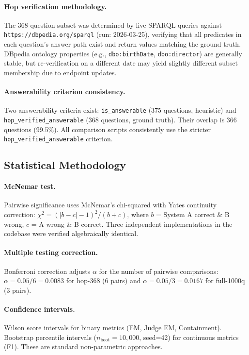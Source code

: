 \paragraph{Hop verification methodology.}
The 368-question subset was determined by live SPARQL queries against \texttt{https://dbpedia.org/sparql} (run: 2026-03-25), verifying that all predicates in each question's answer path exist and return values matching the ground truth. DBpedia ontology properties (e.g., \texttt{dbo:birthDate}, \texttt{dbo:director}) are generally stable, but re-verification on a different date may yield slightly different subset membership due to endpoint updates.

\paragraph{Answerability criterion consistency.}
Two answerability criteria exist: \texttt{is\_answerable} (375 questions, heuristic) and \texttt{hop\_verified\_answerable} (368 questions, ground truth). Their overlap is 366 questions (99.5\%). All comparison scripts consistently use the stricter \texttt{hop\_verified\_answerable} criterion.

\subsection{Statistical Methodology}
\label{sec:stat-methods}

\paragraph{McNemar test.}
Pairwise significance uses McNemar's chi-squared with Yates continuity correction: $\chi^2 = (|b - c| - 1)^2 / (b + c)$, where $b$ = System A correct \& B wrong, $c$ = A wrong \& B correct. Three independent implementations in the codebase were verified algebraically identical.

\paragraph{Multiple testing correction.}
Bonferroni correction adjusts $\alpha$ for the number of pairwise comparisons: $\alpha = 0.05/6 = 0.0083$ for hop-368 (6 pairs) and $\alpha = 0.05/3 = 0.0167$ for full-1000q (3 pairs).

\paragraph{Confidence intervals.}
Wilson score intervals for binary metrics (EM, Judge EM, Containment). Bootstrap percentile intervals ($n_{\text{boot}}=10{,}000$, seed=42) for continuous metrics (F1). These are standard non-parametric approaches.

